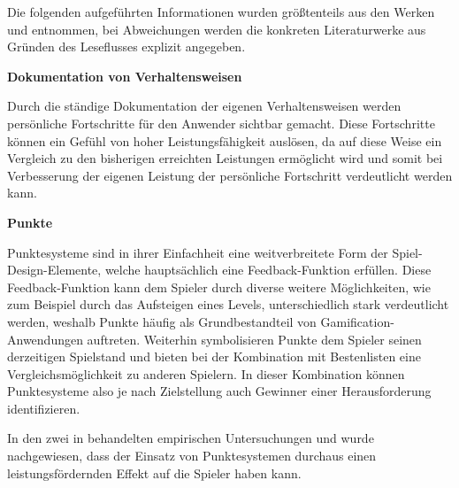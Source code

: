 \documentclass[bibliography=totoc,listof=totoc,BCOR=5mm,DIV=12,oneside]{scrbook}
\begin{document}
\par \bigskip Die folgenden aufgeführten Informationen wurden größtenteils aus den Werken \citep[Kapitel 2.2.2 Analyse einzelner Spiel-Design-Elemente]{Sailer2016} und \citep[Kapitel 4 The Gamification Toolkit Game Elements]{werbach2012win} entnommen, bei Abweichungen werden die konkreten Literaturwerke aus Gründen des Leseflusses explizit angegeben.

\par \bigskip \textbf{Dokumentation von Verhaltensweisen}
\par Durch die ständige Dokumentation der eigenen Verhaltensweisen werden persönliche Fortschritte für den Anwender sichtbar gemacht. Diese Fortschritte können ein Gefühl von hoher Leistungsfähigkeit auslösen, da auf diese Weise ein Vergleich zu den bisherigen erreichten Leistungen ermöglicht wird und somit bei Verbesserung der eigenen Leistung der persönliche Fortschritt verdeutlicht werden kann.

\par \bigskip \textbf{Punkte}
\par Punktesysteme sind in ihrer Einfachheit eine weitverbreitete Form der Spiel-Design-Elemente, welche hauptsächlich eine Feedback-Funktion erfüllen. Diese Feedback-Funktion kann dem Spieler durch diverse weitere Möglichkeiten, wie zum Beispiel durch das Aufsteigen eines Levels, unterschiedlich stark verdeutlicht werden, weshalb Punkte häufig als Grundbestandteil von Gamification-Anwendungen auftreten. Weiterhin symbolisieren Punkte dem Spieler seinen derzeitigen Spielstand und bieten bei der Kombination mit Bestenlisten eine Vergleichsmöglichkeit zu anderen Spielern. In dieser Kombination können Punktesysteme also je nach Zielstellung auch Gewinner einer Herausforderung identifizieren.
\par In den zwei in \citep{Sailer2016} behandelten empirischen Untersuchungen \citep{mekler2013disassembling} und \citep{mekler2013points} wurde nachgewiesen, dass der Einsatz von Punktesystemen durchaus einen leistungsfördernden Effekt auf die Spieler haben kann.
\end{document}

